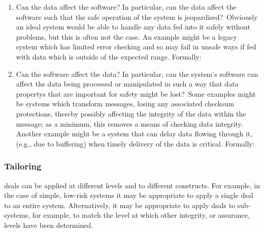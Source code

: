 \begin{enumerate}
  \item Can the data affect the software? In particular, \cbstart can the data affect the software such that the safe operation of the system is jeopardised?\cbend\ Obviously an ideal system would be able to handle any data fed into it safely without problems, but this is often not the case. An example might be a legacy system which has limited error checking and so may fail in unsafe ways if fed with data which is outside of the expected range. Formally\cbstart: \cbend{}
  \item Can the software affect the data? In particular, \cbstart can the system's software can affect the data being processed or manipulated in such a way that \glspl{data property} that are important for safety might be lost?\cbend\ Some examples might be systems which transform messages, losing any associated checksum protections, thereby possibly affecting the \gls{integrity} of the data within the message; as a minimum, this removes a means of checking data \gls{integrity}. Another example might be a system that can delay data flowing through it, (e.g., due to buffering) when timely delivery of the data is critical. Formally\cbstart:\cbend\ 
\end{enumerate}

\subsubsection{Tailoring}\label{bkm:activities:analyse:tailoring}
\glspl{dsal} can be applied at different levels and to different constructs. For example, in the case of simple, low-risk systems it may be appropriate to apply a single \gls{dsal} to an entire system. Alternatively, it may be appropriate to apply \glspl{dsal} to sub-systems, for example, to match the level at which other \gls{integrity}, or assurance, levels have been determined. 


